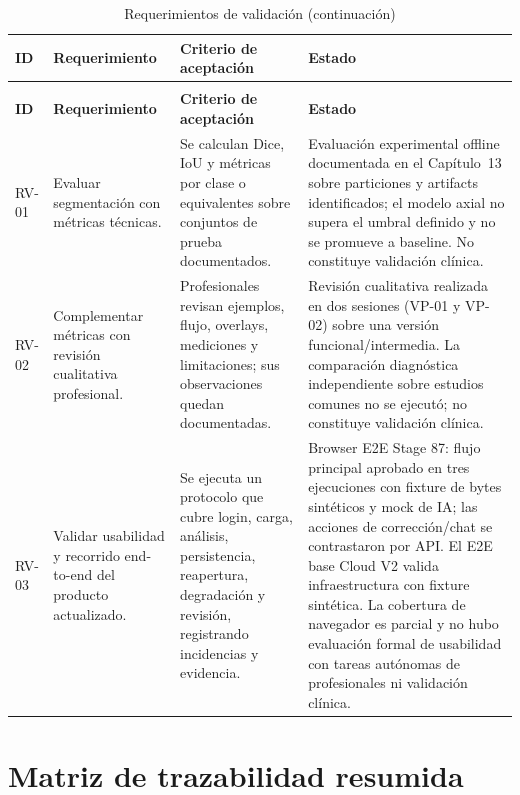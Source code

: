 {\footnotesize
\setlength{\LTleft}{0pt}
\setlength{\LTright}{0pt}
\setlength{\tabcolsep}{2pt}
\renewcommand{\arraystretch}{1.18}
\begin{longtable}{>{\raggedright\arraybackslash}p{} >{\raggedright\arraybackslash}p{} >{\raggedright\arraybackslash}p{} >{\raggedright\arraybackslash}p{}}
\caption{Requerimientos de validación}\label{tab:req-validacion}\\
\hline
\textbf{ID} & \textbf{Requerimiento} & \textbf{Criterio de aceptación} & \textbf{Estado} \\
\hline
\endfirsthead
\caption[]{Requerimientos de validación (continuación)}\\
\hline
\textbf{ID} & \textbf{Requerimiento} & \textbf{Criterio de aceptación} & \textbf{Estado} \\
\hline
\endhead
\hline
\endfoot
RV-01 & Evaluar segmentación con métricas técnicas. & Se calculan Dice, IoU y métricas por clase o equivalentes sobre conjuntos de prueba documentados. & Evaluación experimental offline documentada en el Capítulo~13 sobre particiones y artifacts identificados; el modelo axial no supera el umbral definido y no se promueve a baseline. No constituye validación clínica. \\
RV-02 & Complementar métricas con revisión cualitativa profesional. & Profesionales revisan ejemplos, flujo, overlays, mediciones y limitaciones; sus observaciones quedan documentadas. & Revisión cualitativa realizada en dos sesiones (VP-01 y VP-02) sobre una versión funcional/intermedia. La comparación diagnóstica independiente sobre estudios comunes no se ejecutó; no constituye validación clínica. \\
RV-03 & Validar usabilidad y recorrido end-to-end del producto actualizado. & Se ejecuta un protocolo que cubre login, carga, análisis, persistencia, reapertura, degradación y revisión, registrando incidencias y evidencia. & Browser E2E Stage 87: flujo principal aprobado en tres ejecuciones con fixture de bytes sintéticos y mock de IA; las acciones de corrección/chat se contrastaron por API. El E2E base Cloud V2 valida infraestructura con fixture sintética. La cobertura de navegador es parcial y no hubo evaluación formal de usabilidad con tareas autónomas de profesionales ni validación clínica. \\
\hline
\end{longtable}
}

\section{Matriz de trazabilidad resumida}

